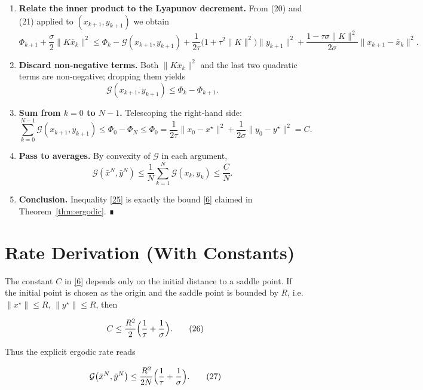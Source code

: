 \documentclass[11pt]{article}
\newcommand{\gap}{\mathcal{G}}
\begin{document}
\begin{enumerate}[label=[Step \arabic*]]
\item \textbf{Relate the inner product to the Lyapunov decrement.}  
From (20) and (21) applied to $(x_{k+1},y_{k+1})$ we obtain
\[
\Phi_{k+1}+\frac{\sigma}{2}\|K\bar{x}_{k}\|^{2}
\le \Phi_{k}
   -\mathcal{G}(x_{k+1},y_{k+1})
   +\frac{1}{2\tau}\bigl(1+\tau^{2}\|K\|^{2}\bigr)\|y_{k+1}\|^{2}
   +\frac{1-\tau\sigma\|K\|^{2}}{2\sigma}\|x_{k+1}-\bar{x}_{k}\|^{2}.
\tag{22}
\]

\item \textbf{Discard non‑negative terms.}  
Both $\|K\bar{x}_{k}\|^{2}$ and the last two quadratic terms are non‑negative; dropping them yields
\[
\mathcal{G}(x_{k+1},y_{k+1})
\le \Phi_{k}-\Phi_{k+1}.
\tag{23}
\]

\item \textbf{Sum from $k=0$ to $N-1$.}  
Telescoping the right‑hand side:
\[
\sum_{k=0}^{N-1}\mathcal{G}(x_{k+1},y_{k+1})
\le \Phi_{0}-\Phi_{N}
\le \Phi_{0}
= \frac{1}{2\tau}\|x_{0}-x^{\star}\|^{2}
  +\frac{1}{2\sigma}\|y_{0}-y^{\star}\|^{2}=C.
\tag{24}
\]

\item \textbf{Pass to averages.}  
By convexity of $\mathcal{G}$ in each argument,
\[
\mathcal{G}(\bar{x}^{N},\bar{y}^{N})
\le \frac{1}{N}\sum_{k=1}^{N}\mathcal{G}(x_{k},y_{k})
\le \frac{C}{N}.
\tag{25}
\]

\item \textbf{Conclusion.}  
Inequality \eqref{25} is exactly the bound \eqref{6} claimed in Theorem~\ref{thm:ergodic}. ∎
\end{enumerate}

\section*{Rate Derivation (With Constants)}
The constant $C$ in \eqref{6} depends only on the initial distance to a saddle point.  
If the initial point is chosen as the origin and the saddle point is bounded by $R$, i.e. $\|x^{\star}\|\le R$, $\|y^{\star}\|\le R$, then  

\[
C\le \frac{R^{2}}{2}\Bigl(\frac{1}{\tau}+\frac{1}{\sigma}\Bigr).
\tag{26}
\]

Thus the explicit ergodic rate reads  

\[
\gap\big(\bar{x}^{N},\bar{y}^{N}\big)
\le \frac{R^{2}}{2N}\Bigl(\frac{1}{\tau}+\frac{1}{\sigma}\Bigr).
\tag{27}
\]
\end{document}
